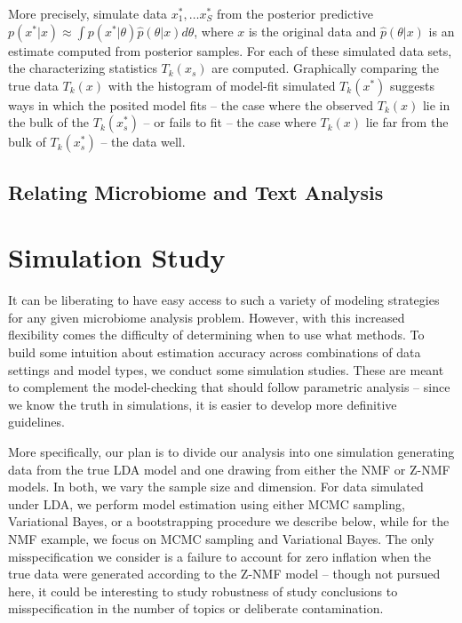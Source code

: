 \documentclass[oupdraft]{bio}
\begin{document}
More precisely, simulate data $x_{1}^{\ast}, \dots x_{S}^{\ast}$ from the
posterior predictive $p\left(x^{\ast}\vert x\right) \approx \int p\left(x^{\ast}
\vert \theta\right) \hat{p}\left(\theta \vert x \right)d\theta$, where $x$ is
the original data and $\hat{p}\left(\theta \vert x\right)$ is an estimate
computed from posterior samples. For each of these simulated data sets, the
characterizing statistics $T_{k}\left(x_{s}\right)$ are computed. Graphically
comparing the true data $T_{k}\left(x\right)$ with the histogram of model-fit
simulated $T_{k}\left(x^{\ast}\right)$ suggests ways in which the posited model
fits -- the case where the observed $T_{k}\left(x\right)$ lie in the bulk of the
$T_{k}\left(x^{\ast}_{s}\right)$ -- or fails to fit -- the case where
$T_{k}\left(x\right)$ lie far from the bulk of $T_{k}\left(x^{\ast}_{s}\right)$
-- the data well.

\subsection{Relating Microbiome and Text Analysis}

\section{Simulation Study}

It can be liberating to have easy access to such a variety of modeling
strategies for any given microbiome analysis problem. However, with this
increased flexibility comes the difficulty of determining when to use what
methods. To build some intuition about estimation accuracy across combinations
of data settings and model types, we conduct some simulation studies. These are
meant to complement the model-checking that should follow parametric analysis --
since we know the truth in simulations, it is easier to develop more definitive
guidelines.

More specifically, our plan is to divide our analysis into one simulation
generating data from the true LDA model and one drawing from either the NMF or
Z-NMF models. In both, we vary the sample size and dimension. For data simulated
under LDA, we perform model estimation using either MCMC sampling, Variational
Bayes, or a bootstrapping procedure we describe below, while for the NMF
example, we focus on MCMC sampling and Variational Bayes. The only
misspecification we consider is a failure to account for zero inflation when the
true data were generated according to the Z-NMF model -- though not pursued
here, it could be interesting to study robustness of study conclusions to
misspecification in the number of topics or deliberate contamination.
\end{document}
